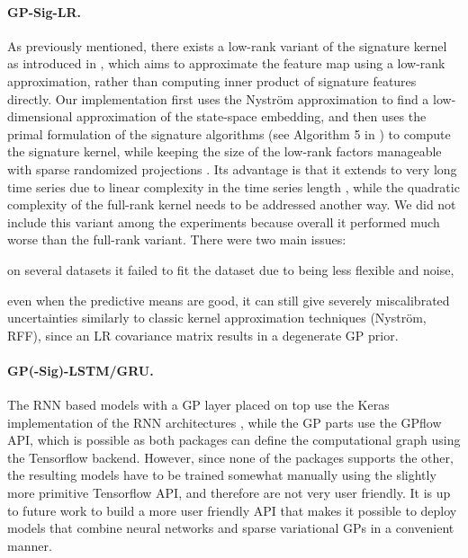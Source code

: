 \documentclass{article}
\begin{document}
\paragraph{GP-Sig-LR.} As previously mentioned, there exists a low-rank variant of the signature kernel as introduced in \cite{KiralyOberhauser2019KSig}, which aims to approximate the feature map using a low-rank approximation, rather than computing inner product of signature features directly. Our implementation first uses the Nyström approximation to find a low-dimensional approximation of the state-space embedding, and then uses the primal formulation of the signature algorithms (see Algorithm 5 in \cite{KiralyOberhauser2019KSig}) to compute the signature kernel, while keeping the size of the low-rank factors manageable with sparse randomized projections \cite{Li2006VerySparse}. Its advantage is that it extends to very long time series due to linear complexity in the time series length , while the quadratic complexity of the full-rank kernel needs to be addressed another way. We did not include this variant among the experiments because overall it performed much worse than the full-rank variant. There were two main issues: \begin{enumerate*}[label=(\roman*)] \item on several datasets it failed to fit the dataset due to being less flexible and noise, \item even when the predictive means are good, it can still give severely miscalibrated uncertainties similarly to classic kernel approximation techniques (Nyström, RFF), since an LR covariance matrix results in a degenerate GP prior. \end{enumerate*}  

\paragraph{GP(-Sig)-LSTM/GRU.} The RNN based models with a GP layer placed on top use the Keras implementation of the RNN architectures \cite{Chollet2015Keras}, while the GP parts use the GPflow API, which is possible as both packages can define the computational graph using the Tensorflow backend. However, since none of the packages supports the other, the resulting models have to be trained somewhat manually using the slightly more primitive Tensorflow API, and therefore are not very user friendly. It is up to future work to build a more user friendly API that makes it possible to deploy models that combine neural networks and sparse variational GPs in a convenient manner.
\end{document}
